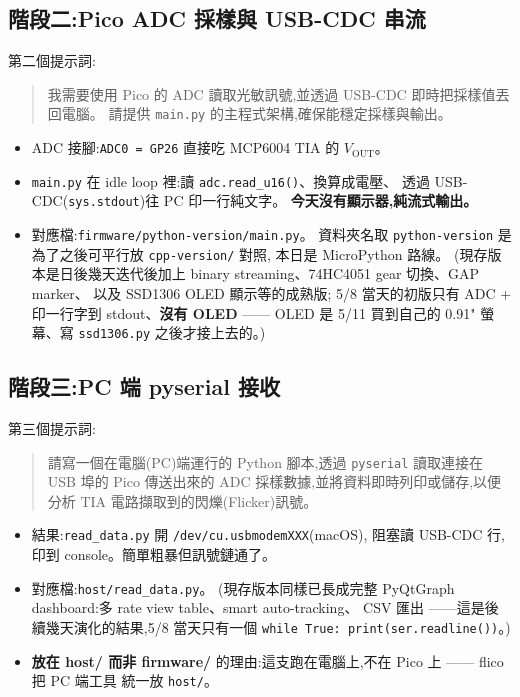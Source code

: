 \subsection*{階段二:Pico ADC 採樣與 USB-CDC 串流}

第二個提示詞:

\begin{quote}\small
我需要使用 Pico 的 ADC 讀取光敏訊號,並透過 USB-CDC 即時把採樣值丟回電腦。
請提供 \texttt{main.py} 的主程式架構,確保能穩定採樣與輸出。
\end{quote}

\begin{itemize}[leftmargin=2em,itemsep=0pt]
  \item ADC 接腳:\texttt{ADC0 = GP26} 直接吃 MCP6004 TIA 的 \(V_\text{OUT}\)。
  \item \texttt{main.py} 在 idle loop 裡:讀 \texttt{adc.read\_u16()}、換算成電壓、
        透過 USB-CDC(\texttt{sys.stdout})往 PC 印一行純文字。
        \textbf{今天沒有顯示器,純流式輸出。}
  \item 對應檔:\texttt{firmware/python-version/main.py}。
        資料夾名取 \texttt{python-version} 是為了之後可平行放 \texttt{cpp-version/} 對照,
        本日是 MicroPython 路線。
        (現存版本是日後幾天迭代後加上 binary streaming、74HC4051 gear 切換、GAP marker、
        以及 SSD1306 OLED 顯示等的成熟版;
        5/8 當天的初版只有 ADC + 印一行字到 stdout、\textbf{沒有 OLED} ——
        OLED 是 5/11 買到自己的 0.91" 螢幕、寫 \texttt{ssd1306.py} 之後才接上去的。)
\end{itemize}

\subsection*{階段三:PC 端 pyserial 接收}

第三個提示詞:

\begin{quote}\small
請寫一個在電腦(PC)端運行的 Python 腳本,透過 \texttt{pyserial} 讀取連接在 USB 埠的
Pico 傳送出來的 ADC 採樣數據,並將資料即時列印或儲存,以便分析 TIA 電路擷取到的閃爍(Flicker)訊號。
\end{quote}

\begin{itemize}[leftmargin=2em,itemsep=0pt]
  \item 結果:\texttt{read\_data.py} 開 \texttt{/dev/cu.usbmodemXXX}(macOS),
        阻塞讀 USB-CDC 行,印到 console。簡單粗暴但訊號鏈通了。
  \item 對應檔:\texttt{host/read\_data.py}。
        (現存版本同樣已長成完整 PyQtGraph dashboard:多 rate view table、smart auto-tracking、
        CSV 匯出 ——這是後續幾天演化的結果,5/8 當天只有一個 \texttt{while True: print(ser.readline())}。)
  \item \textbf{放在 host/ 而非 firmware/} 的理由:這支跑在電腦上,不在 Pico 上 —— flico 把 PC 端工具
        統一放 \texttt{host/}。
\end{itemize}

